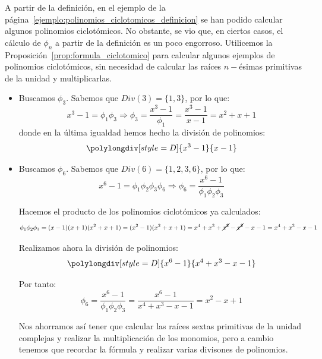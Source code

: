\begin{ejemplo}
    A partir de la definición, en el ejemplo de la página~\ref{ejemplo:polinomios_ciclotomicos_definicion} se han podido calcular algunos polinomios ciclotómicos. No obstante, se vio que, en ciertos casos, el cálculo de $\phi_n$ a partir de la definición es un poco engorroso. Utilicemos la Proposición~\ref{prop:formula_ciclotomico} para calcular algunos ejemplos de polinomios ciclotómicos, sin necesidad de calcular las raíces $n-$ésimas primitivas de la unidad y multiplicarlas.
    \begin{itemize}
        \item Buscamos $\phi_3$. Sabemos que $Div(3) = \{1,3\}$, por lo que:
            \begin{equation*}
                x^3-1 = \phi_1\phi_3\Longrightarrow \phi_3 = \frac{x^3-1}{\phi_1} = \frac{x^3-1}{x-1} = x^2+x+1
            \end{equation*}
            donde en la última igualdad hemos hecho la división de polinomios:
            \begin{equation*}
                \polylongdiv[style=D]{x^3-1}{x-1}
            \end{equation*}

        \item Buscamos $\phi_6$. Sabemos que $Div(6) = \{1,2,3,6\}$, por lo que:
            \begin{equation*}
                x^6-1 = \phi_1\phi_2\phi_3\phi_6\Longrightarrow \phi_6 = \frac{x^6-1}{\phi_1\phi_2\phi_3}
            \end{equation*}

            Hacemos el producto de los polinomios ciclotómicos ya calculados:
            \begin{equation*}
                \phi_1\phi_2\phi_3 = (x-1)(x+1)(x^2+x+1) = (x^2-1)(x^2+x+1) = x^4+x^3+\cancel{x^2}-\cancel{x^2}-x-1 = x^4+x^3-x-1
            \end{equation*}

            Realizamos ahora la división de polinomios:
            \begin{equation*}
                \polylongdiv[style=D]{x^6-1}{x^4+x^3-x-1}
            \end{equation*}

            Por tanto:
            \begin{equation*}
                \phi_6 = \dfrac{x^6-1}{\phi_1\phi_2\phi_3} = \dfrac{x^6-1}{x^4+x^3-x-1} = x^2-x+1
            \end{equation*}

            Nos ahorramos así tener que calcular las raíces sextas primitivas de la unidad complejas y realizar la multiplicación de los monomios, pero a cambio tenemos que recordar la fórmula y realizar varias divisones de polinomios.
    \end{itemize}
\end{ejemplo}

